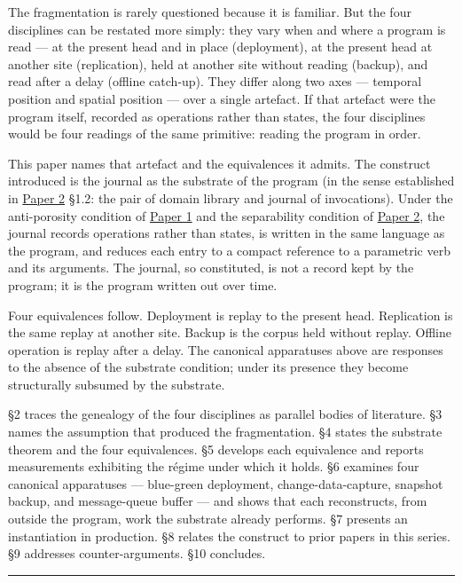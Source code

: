 \documentclass[
]{article}
\begin{document}
The fragmentation is rarely questioned because it is familiar. But the
four disciplines can be restated more simply: they vary when and where a
program is read --- at the present head and in place (deployment), at
the present head at another site (replication), held at another site
without reading (backup), and read after a delay (offline catch-up).
They differ along two axes --- temporal position and spatial position
--- over a single artefact. If that artefact were the program itself,
recorded as operations rather than states, the four disciplines would be
four readings of the same primitive: reading the program in order.

This paper names that artefact and the equivalences it admits. The
construct introduced is the journal as the substrate of the program (in
the sense established in \href{02-program-value-separability.md}{Paper
2} §1.2: the pair of domain library and journal of invocations). Under
the anti-porosity condition of \href{01-anti-porosity.md}{Paper 1} and
the separability condition of
\href{02-program-value-separability.md}{Paper 2}, the journal records
operations rather than states, is written in the same language as the
program, and reduces each entry to a compact reference to a parametric
verb and its arguments. The journal, so constituted, is not a record
kept by the program; it is the program written out over time.

Four equivalences follow. Deployment is replay to the present head.
Replication is the same replay at another site. Backup is the corpus
held without replay. Offline operation is replay after a delay. The
canonical apparatuses above are responses to the absence of the
substrate condition; under its presence they become structurally
subsumed by the substrate.

§2 traces the genealogy of the four disciplines as parallel bodies of
literature. §3 names the assumption that produced the fragmentation. §4
states the substrate theorem and the four equivalences. §5 develops each
equivalence and reports measurements exhibiting the régime under which
it holds. §6 examines four canonical apparatuses --- blue-green
deployment, change-data-capture, snapshot backup, and message-queue
buffer --- and shows that each reconstructs, from outside the program,
work the substrate already performs. §7 presents an instantiation in
production. §8 relates the construct to prior papers in this series. §9
addresses counter-arguments. §10 concludes.

\begin{center}\rule{0.5\linewidth}{0.5pt}\end{center}
\end{document}
